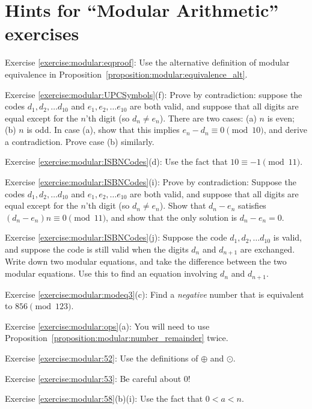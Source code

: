 \section{Hints for ``Modular Arithmetic'' exercises}\label{sec:modular_arithmetic:hints}

\noindent Exercise \ref{exercise:modular:eqproof}: Use the alternative definition of modular equivalence in Proposition~\ref{proposition:modular:equivalence_alt}.

\noindent Exercise \ref{exercise:modular:UPCSymbols}(f): Prove by contradiction: 
suppose the codes  $d_1, d_2, \ldots  d_{10}$  and $e_1, e_2, \ldots  e_{10}$ are both valid, and suppose that all digits are equal except for the $n$'th digit (so $d_n \neq e_n$).
There are two cases: (a) $n$ is even; (b) $n$ is odd. In case (a), show that this implies $e_n - d_n \equiv 0  \pmod{10}$, and derive a contradiction. Prove case (b) similarly.

\noindent Exercise \ref{exercise:modular:ISBNCodes}(d): Use the fact that $10 \equiv -1 \pmod{11}$.

\noindent Exercise \ref{exercise:modular:ISBNCodes}(i): Prove by contradiction: Suppose the codes  $d_1, d_2, \ldots  d_{10}$  and $e_1, e_2, \ldots  e_{10}$ are both valid, and suppose that all digits are equal except for the $n$'th digit (so $d_n \neq e_n$). Show that $d_n - e_n$ satisfies $(d_n - e_n)n \equiv 0 \pmod{11}$, and show that the only solution is $d_n - e_n = 0$.

\noindent Exercise \ref{exercise:modular:ISBNCodes}(j): Suppose the code $d_1, d_2, \ldots  d_{10}$  is valid, and suppose the code is still valid when the digits $d_n$ and $d_{n+1}$ are exchanged. Write down two modular equations, and take the difference between the two modular equations.  Use this to find an equation involving $d_n$ and $d_{n+1}$.

\noindent Exercise \ref{exercise:modular:modeq3}(c): Find a \emph{negative} number that is equivalent to $856 \pmod{123}$.

\noindent Exercise \ref{exercise:modular:ops}(a): You will need to use Proposition~\ref{proposition:modular:number_remainder} twice.

\noindent Exercise \ref{exercise:modular:52}: Use the definitions of $\oplus$ and $\odot$.

\noindent Exercise \ref{exercise:modular:53}: Be careful about 0!

\noindent Exercise \ref{exercise:modular:58}(b)(i): Use the fact that $0 < a < n$.

